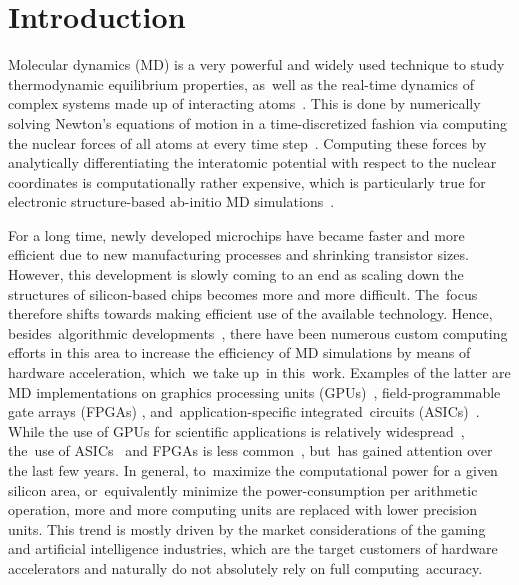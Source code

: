 \documentclass[computation,article,accept,moreauthors,pdftex]{Definitions/mdpi}
\newcommand{\review}[1]{{\color{BrickRed}#1}}
\begin{document}

\section{Introduction}

Molecular dynamics (MD) is a very powerful and widely used technique to study thermodynamic equilibrium properties, as~well as the real-time dynamics of complex systems made up of interacting atoms~\cite{AlderWainwright1957}. This is done by numerically solving Newton's equations of motion in a time-discretized fashion via computing the nuclear forces of all atoms at every time step~\cite{RahmanMD}. Computing these forces by analytically differentiating the interatomic potential with respect to the nuclear coordinates is computationally rather expensive, which is particularly true for electronic structure-based {ab-initio} MD simulations~\cite{CPMD, CPMD_TDK, PayneRMP, WIRES_TDK}.

For a long time, newly developed microchips have became faster and more efficient due to new manufacturing processes and shrinking transistor sizes. However, this development is slowly coming to an end as scaling down the structures of silicon-based chips becomes more and more difficult. The~focus therefore shifts towards making efficient use of the available technology. Hence, besides~algorithmic developments~\cite{MTS, Snir, GSE, Shaw, VerletCell, pSHAKE, John, Prodan}, there have been numerous custom computing efforts in this area to increase the efficiency of MD simulations by means of hardware acceleration, which~we take up~in this~work. Examples of the latter are MD implementations on graphics processing units (GPUs)~\cite{HOOMD, NAMD, OpenMM, HalMD, Lammps, Amber, Gromacs}, field-programmable gate arrays (FPGAs) \cite{HerbordtI, HerbordtII}, and~application-specific integrated~circuits (ASICs)~\cite{AntonI, AntonII}.
While the use of GPUs for scientific applications is relatively widespread~\cite{GPUcomp,Binder,Weigel}, the~use of ASICs~\cite{QCDScience, QCDOC, GrapeScience, Grape} and FPGAs is less common~\cite{JanusI, JanusII, Convey, FDTD, Kenter, Galerkin}, but~has gained attention over the last few years.
In general, to~maximize the computational power for a given silicon area, or~equivalently minimize the power-consumption per arithmetic operation, more and more computing units are replaced with lower precision units. This trend is mostly driven by the market considerations of the gaming and artificial intelligence industries, which are the target customers of hardware accelerators and naturally do not absolutely rely on full computing~accuracy.
\end{document}
